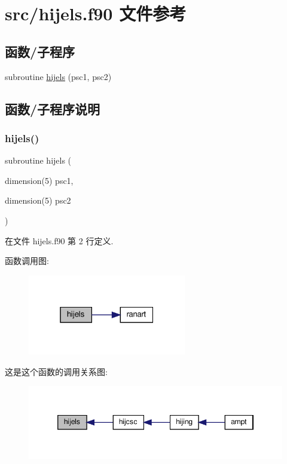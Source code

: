 \hypertarget{hijels_8f90}{}\section{src/hijels.f90 文件参考}
\label{hijels_8f90}
\subsection*{函数/子程序}
\begin{DoxyCompactItemize}
\item 
subroutine \mbox{\hyperlink{hijels_8f90_a07da5a99693ffec403a4c3b0c5344b54}{hijels}} (psc1, psc2)
\end{DoxyCompactItemize}


\subsection{函数/子程序说明}
\mbox{\label{hijels_8f90_a07da5a99693ffec403a4c3b0c5344b54}} 
\subsubsection{\texorpdfstring{hijels()}{hijels()}}
{\footnotesize\ttfamily subroutine hijels (\begin{DoxyParamCaption}\item[{dimension(5)}]{psc1,  }\item[{dimension(5)}]{psc2 }\end{DoxyParamCaption})}



在文件 hijels.\+f90 第 2 行定义.

函数调用图\+:
\nopagebreak
\begin{figure}[H]
\begin{center}
\leavevmode
\includegraphics[width=196pt]{hijels_8f90_a07da5a99693ffec403a4c3b0c5344b54_cgraph}
\end{center}
\end{figure}
这是这个函数的调用关系图\+:
\nopagebreak
\begin{figure}[H]
\begin{center}
\leavevmode
\includegraphics[width=346pt]{hijels_8f90_a07da5a99693ffec403a4c3b0c5344b54_icgraph}
\end{center}
\end{figure}
